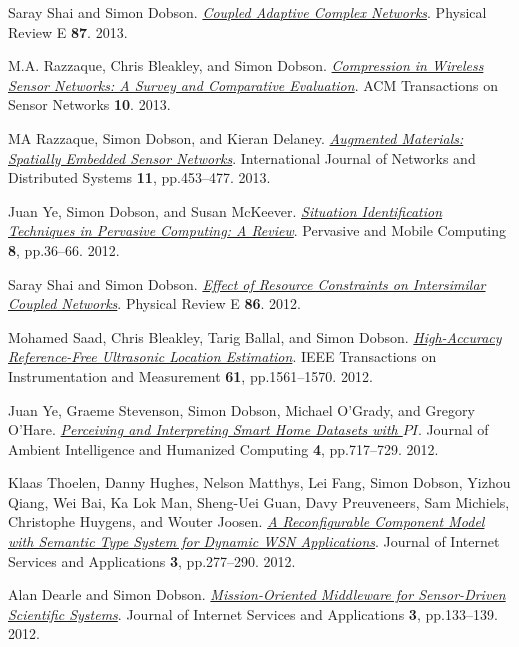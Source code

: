 \documentclass[11pt]{article}
\begin{document}
\label{org5c8d841}Saray Shai and Simon Dobson.  \emph{\href{https://dx.doi.org//10.1103/PhysRevE.87.042812}{Coupled Adaptive Complex Networks}}. Physical Review E \textbf{87}. 2013.

\label{orge996c80}M.A. Razzaque, Chris Bleakley, and Simon Dobson.  \emph{\href{https://dx.doi.org//10.1145/2528948}{Compression in Wireless Sensor Networks: A Survey and Comparative Evaluation}}. ACM Transactions on Sensor Networks \textbf{10}. 2013.

\label{org9fa2f1e}MA Razzaque, Simon Dobson, and Kieran Delaney.  \emph{\href{https://dx.doi.org//10.1504/IJCNDS.2013.057721}{Augmented Materials: Spatially Embedded Sensor Networks}}. International Journal of Networks and Distributed Systems \textbf{11}, pp.453–477. 2013.

\label{org4cfeb31}Juan Ye, Simon Dobson, and Susan McKeever.  \emph{\href{https://dx.doi.org//10.1016/j.pmcj.2011.01.004}{Situation Identification Techniques in Pervasive Computing: A Review}}. Pervasive and Mobile Computing \textbf{8}, pp.36–66. 2012.

\label{org4b994d5}Saray Shai and Simon Dobson.  \emph{\href{https://dx.doi.org//10.1103/PhysRevE.86.066120}{Effect of Resource Constraints on Intersimilar Coupled Networks}}. Physical Review E \textbf{86}. 2012.

\label{orgee9d544}Mohamed Saad, Chris Bleakley, Tarig Ballal, and Simon Dobson.  \emph{\href{https://dx.doi.org//10.1109/TIM.2011.2181911}{High-Accuracy Reference-Free Ultrasonic Location Estimation}}. IEEE Transactions on Instrumentation and Measurement \textbf{61}, pp.1561–1570. 2012.

\label{org84769fa}Juan Ye, Graeme Stevenson, Simon Dobson, Michael O’Grady, and Gregory O’Hare.  \emph{\href{https://dx.doi.org//10.1007/s12652-012-0148-5}{Perceiving and Interpreting Smart Home Datasets with \(PI\)}}. Journal of Ambient Intelligence and Humanized Computing \textbf{4}, pp.717–729. 2012.

\label{org12b3707}Klaas Thoelen, Danny Hughes, Nelson Matthys, Lei Fang, Simon Dobson, Yizhou Qiang, Wei Bai, Ka Lok Man, Sheng-Uei Guan, Davy Preuveneers, Sam Michiels, Christophe Huygens, and Wouter Joosen.  \emph{\href{https://dx.doi.org//10.1007/s13174-012-0064-0}{A Reconfigurable Component Model with Semantic Type System for Dynamic WSN Applications}}. Journal of Internet Services and Applications \textbf{3}, pp.277–290. 2012.

\label{org0aef9bf}Alan Dearle and Simon Dobson.  \emph{\href{https://dx.doi.org//10.1007/s13174-011-0052-9}{Mission-Oriented Middleware for Sensor-Driven Scientific Systems}}. Journal of Internet Services and Applications \textbf{3}, pp.133–139. 2012.
\end{document}
